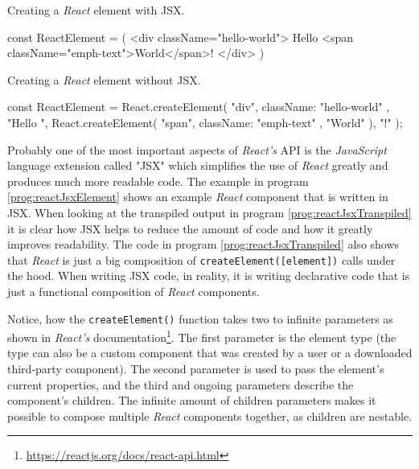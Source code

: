 \begin{program}
\caption{Creating a \emph{React} element with JSX.} 
\label{prog:reactJsxElement}
\begin{JsCode}
const ReactElement = (
  <div className="hello-world">
    Hello <span className="emph-text">World</span>!
  </div>
)
\end{JsCode}
\end{program}

\begin{program}
\caption{Creating a \emph{React} element without JSX.} 
\label{prog:reactJsxTranspiled}
\begin{JsCode}
const ReactElement = React.createElement(
  "div", 
  { className: "hello-world" }, 
  "Hello ", 
  React.createElement(
    "span", 
    { className: "emph-text" }, 
    "World"
  ), 
  "!"
);
\end{JsCode}
\end{program}

Probably one of the most important aspects of \emph{React's} API is the \emph{JavaScript} language extension called "JSX" which simplifies the use of \emph{React} greatly and produces much more readable code. The example in program \ref{prog:reactJsxElement} shows an example \emph{React} component that is written in JSX. When looking at the transpiled output in program \ref{prog:reactJsxTranspiled} it is clear how JSX helps to reduce the amount of code and how it greatly improves readability. The code in program \ref{prog:reactJsxTranspiled} also shows that \emph{React} is just a big composition of \texttt{createElement([element])} calls under the hood. When writing JSX code, in reality, it is writing declarative code that is just a functional composition of \emph{React} components. 

Notice, how the \texttt{createElement()} function takes two to infinite parameters as shown in \emph{React's} documentation\footnote{\url{https://reactjs.org/docs/react-api.html}}. The first parameter is the element type (the type can also be a custom component that was created by a user or a downloaded third-party component). The second parameter is used to pass the element's current properties, and the third and ongoing parameters describe the component's children. The infinite amount of children parameters makes it possible to compose multiple \emph{React} components together, as children are nestable. 

